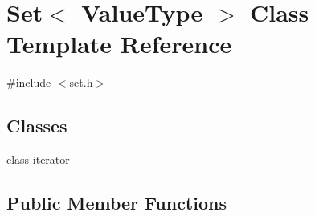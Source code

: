 \hypertarget{classSet}{}\section{Set$<$ Value\+Type $>$ Class Template Reference}
\label{classSet}


{\ttfamily \#include $<$set.\+h$>$}

\subsection*{Classes}
\begin{DoxyCompactItemize}
\item 
class \mbox{\hyperlink{classSet_1_1iterator}{iterator}}
\end{DoxyCompactItemize}
\subsection*{Public Member Functions}
